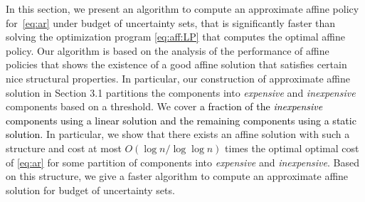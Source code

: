 \documentclass[moor]{informs1}              %
\newcommand*{\red}{\textcolor{black}}
\begin{document}
In this section, we present an algorithm to compute an approximate affine policy for~\eqref{eq:ar} under budget of uncertainty sets, that is significantly faster than solving the optimization program  \eqref{eq:aff:LP} that computes the optimal affine policy. Our algorithm is based on the analysis of the performance of affine policies  that shows the existence of a good affine solution that satisfies certain nice structural properties. In particular, our construction of approximate affine solution in Section 3.1 partitions the components into {\em expensive} and {\em inexpensive} components based on a threshold. We cover \red{ a fraction of the {\em inexpensive} components using a linear solution and the remaining components using a static solution.}  In particular, we show that there exists an affine solution with such a structure and cost at most $O \left( \log n /\log \log n \right)$ times the optimal optimal cost of \eqref{eq:ar} for some partition of components into {\em expensive} and {\em inexpensive}. Based on this structure, we give a faster algorithm to compute an approximate affine solution for budget of uncertainty sets. 
\end{document}
